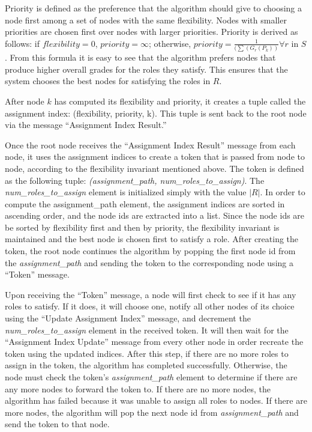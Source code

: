 \documentclass[11pt]{article}
\begin{document}
\begin{multicols}{2}
Priority is defined as the preference that the algorithm should give to choosing a node first among a set of nodes with the same flexibility. Nodes with smaller priorities are chosen first over nodes with larger priorities. Priority is derived as follows: if $flexibility = 0$, $priority = \infty$; otherwise, $priority = \frac{1}{(\displaystyle \sum(G_{r}(P_{k}))} \forall r$ in $S$. From this formula it is easy to see that the algorithm prefers nodes that produce higher overall grades for the roles they satisfy. This ensures that the system chooses the best nodes for satisfying the roles in $R$.

After node $k$ has computed its flexibility and priority, it creates a tuple called the assignment index: (flexibility, priority, k). This tuple is sent back to the root node via the message ``Assignment Index Result.''

Once the root node receives the ``Assignment Index Result'' message from each node, it uses the assignment indices to create a token that is passed from node to node, according to the flexibility invariant mentioned above. The token is defined as the following tuple: \textit{(assignment\_path, num\_roles\_to\_assign)}. The \textit{num\_roles\_to\_assign} element is initialized simply with the value $|R|$. In order to compute the assignment\_path element, the assignment indices are sorted in ascending order, and the node ids are extracted into a list. Since the node ids are be sorted by flexibility first and then by priority, the flexibility invariant is maintained and the best node is chosen first to satisfy a role. After creating the token, the root node continues the algorithm by popping the first node id from the \textit{assignment\_path} and sending the token to the corresponding node using a ``Token'' message.

Upon receiving the ``Token'' message, a node will first check to see if it has any roles to satisfy. If it does, it will choose one, notify all other nodes of its choice using the ``Update Assignment Index'' message, and decrement the \textit{num\_roles\_to\_assign} element in the received token. It will then wait for the ``Assignment Index Update'' message from every other node in order recreate the token using the updated indices. After this step, if there are no more roles to assign in the token, the algorithm has completed successfully. Otherwise, the node must check the token's \textit{assignment\_path} element to determine if there are any more nodes to forward the token to. If there are no more nodes, the algorithm has failed because it was unable to assign all roles to nodes. If there are more nodes, the algorithm will pop the next node id from \textit{assignment\_path} and send the token to that node.


\end{multicols}
\end{document}
